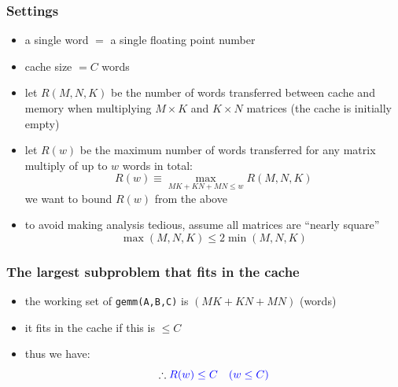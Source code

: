 \documentclass[12pt,dvipdfmx]{beamer}
\newcommand{\ao}[1]{{\color{blue}#1}}
\begin{document}
\begin{frame}
\frametitle{Settings}
\begin{itemize}
\item<1-> a single \ao{word} $=$ a single floating point number
\item<1-> cache size \ao{$= C$ words}
\item<2-> let \ao{$R(M, N, K)$} be
  the number of words transferred between cache and memory when
  multiplying $M\times K$ and $K\times N$ matrices
  (the cache is initially empty)
\item<3-> let \ao{$R(w)$} be the maximum number of words transferred for 
  any matrix multiply of up to $w$ words in total:
\[ R(w) \equiv \max_{MK+KN+MN\leq w} R(M,N,K) \]
we want to bound $R(w)$ from the above
\item<4-> to avoid making analysis tedious, assume all matrices are
  \ao{``nearly square''}
\[ \max(M,N,K) \leq 2 \min(M,N,K) \]
\end{itemize}
\end{frame}

\begin{frame}
\frametitle{The largest subproblem that fits in the cache}
\begin{itemize}
\item the working set of {\tt gemm(A,B,C)} is $(MK+KN+MN)$ (words)
\item it fits in the cache if this is $\leq C$
\item thus we have:
  \[ \therefore \ao{R(w) \leq C \quad (w \leq C)} \]
\end{itemize}
\end{frame}
\end{document}
